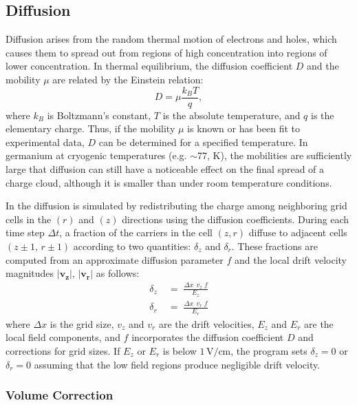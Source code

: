 \subsection{Diffusion}
Diffusion arises from the random thermal motion of electrons and holes, which causes them to spread out from regions of high concentration into regions of lower concentration. In thermal equilibrium, the diffusion coefficient $D$ and the mobility $\mu$
are related by the Einstein relation:
\begin{equation}
D = \mu \frac{k_B T}{q},
\end{equation}
where $k_B$ is Boltzmann's constant, $T$ is the absolute temperature, and $q$ is the elementary charge. Thus, if the mobility $\mu$ is known or has been fit to experimental data, $D$ can be determined for a specified temperature. In germanium at cryogenic temperatures (e.g. $\sim 77$, K), the mobilities are
sufficiently large that diffusion can still have a noticeable effect on the final spread of a charge cloud, although it is smaller than under room temperature conditions.


In {\ehd} the diffusion is simulated by redistributing the charge among neighboring grid cells in the $(r)$ and $(z)$ directions using the diffusion coefficients. During each time step $\Delta t$, a fraction of the carriers in the cell $(z,r)$ diffuse to adjacent cells $(z\pm1,\,r\pm1)$ according to two quantities: $\delta_z$ and $\delta_r$. These fractions are computed from an approximate diffusion parameter $f$ and the local drift velocity magnitudes $\lvert \mathbf{v_z} \rvert$, $\lvert \mathbf{v_r} \rvert$ as follows:
\begin{align}
   \delta_z &\;=\; \frac{\Delta x \;\,v_z \;f}{E_z}\label{eq:deltaez}\\
   \delta_r &\;=\; \frac{\Delta x \;\,v_r \;f}{E_r} \label{eq:deltaer}
\end{align}
where $\Delta x$ is the grid size, $v_{z}$ and $v_{r}$ are the drift velocities, $E_{z}$ and $E_{r}$ are the local field components, and $f$ incorporates the diffusion coefficient $D$ and corrections for grid sizes. If $E_z$ or $E_r$ is below $1\,\mathrm{V/cm}$, the program sets $\delta_z = 0$ or $\delta_r=0$ assuming that the low field regions produce negligible drift velocity.

\subsubsection*{Volume Correction}

